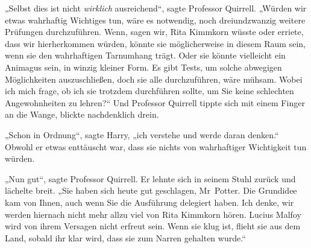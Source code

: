 „Selbst dies ist nicht \emph{wirklich} ausreichend“, sagte Professor Quirrell.
„Würden wir etwas wahrhaftig Wichtiges tun, wäre es notwendig, noch dreiundzwanzig weitere Prüfungen durchzuführen. Wenn, sagen wir, Rita Kimmkorn wüsste oder erriete, dass wir hierherkommen würden, könnte sie möglicherweise in diesem Raum sein, wenn sie den wahrhaftigen Tarnumhang trägt. Oder sie könnte vielleicht ein Animagus sein, in winzig kleiner Form. Es gibt Tests, um solche abwegigen Möglichkeiten auszuschließen, doch sie alle durchzuführen, wäre mühsam. Wobei ich mich frage, ob ich sie trotzdem durchführen sollte, um Sie keine schlechten Angewohnheiten zu lehren?“ Und Professor Quirrell tippte sich mit einem Finger an die Wange, blickte nachdenklich drein.

„Schon in Ordnung“, sagte Harry, „ich verstehe und werde daran denken.“ Obwohl er etwas enttäuscht war, dass sie nichts von wahrhaftiger Wichtigkeit tun würden.

„Nun gut“, sagte Professor Quirrell. Er lehnte sich in seinem Stuhl zurück und lächelte breit.
„Sie haben sich heute gut geschlagen, Mr~Potter. Die Grundidee kam von Ihnen, auch wenn Sie die Ausführung delegiert haben. Ich denke, wir werden hiernach nicht mehr allzu viel von Rita Kimmkorn hören. Lucius Malfoy wird von ihrem Versagen nicht erfreut sein. Wenn sie klug ist, flieht sie aus dem Land, sobald ihr klar wird, dass sie zum Narren gehalten wurde.“

